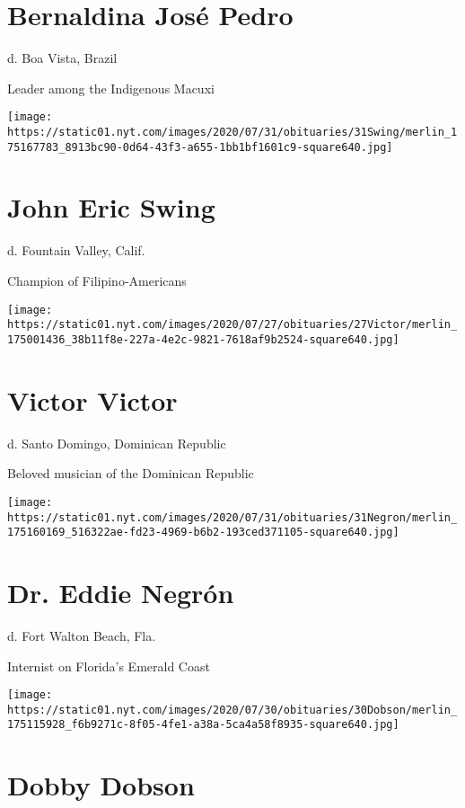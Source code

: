 \hypertarget{bernaldina-josuxe9-pedro}{%
\section{Bernaldina José Pedro}\label{bernaldina-josuxe9-pedro}}

d. Boa Vista, Brazil

Leader among the Indigenous Macuxi

\texttt{[image: https://static01.nyt.com/images/2020/07/31/obituaries/31Swing/merlin\_175167783\_8913bc90-0d64-43f3-a655-1bb1bf1601c9-square640.jpg]}

\hypertarget{john-eric-swing}{%
\section{John Eric Swing}\label{john-eric-swing}}

d. Fountain Valley, Calif.

Champion of Filipino-Americans

\texttt{[image: https://static01.nyt.com/images/2020/07/27/obituaries/27Victor/merlin\_175001436\_38b11f8e-227a-4e2c-9821-7618af9b2524-square640.jpg]}

\hypertarget{victor-victor}{%
\section{Victor Victor}\label{victor-victor}}

d. Santo Domingo, Dominican Republic

Beloved musician of the Dominican Republic

\texttt{[image: https://static01.nyt.com/images/2020/07/31/obituaries/31Negron/merlin\_175160169\_516322ae-fd23-4969-b6b2-193ced371105-square640.jpg]}

\hypertarget{dr-eddie-negruxf3n}{%
\section{Dr. Eddie Negrón}\label{dr-eddie-negruxf3n}}

d. Fort Walton Beach, Fla.

Internist on Florida's Emerald Coast

\texttt{[image: https://static01.nyt.com/images/2020/07/30/obituaries/30Dobson/merlin\_175115928\_f6b9271c-8f05-4fe1-a38a-5ca4a58f8935-square640.jpg]}

\hypertarget{dobby-dobson}{%
\section{Dobby Dobson}\label{dobby-dobson}}

